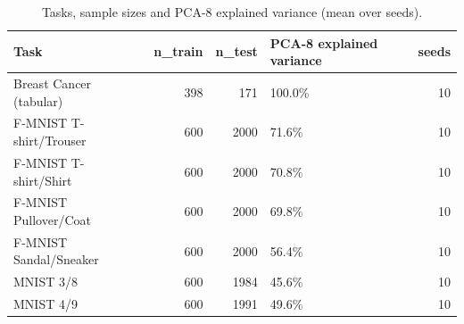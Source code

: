 \begin{table}
\caption{Tasks, sample sizes and PCA-8 explained variance (mean over seeds).}
\label{tab:table1_tasks}
\begin{tabular}{lrrlr}
\toprule
Task & n\_train & n\_test & PCA-8 explained variance & seeds \\
\midrule
Breast Cancer (tabular) & 398 & 171 & 100.0\% & 10 \\
F-MNIST T-shirt/Trouser & 600 & 2000 & 71.6\% & 10 \\
F-MNIST T-shirt/Shirt & 600 & 2000 & 70.8\% & 10 \\
F-MNIST Pullover/Coat & 600 & 2000 & 69.8\% & 10 \\
F-MNIST Sandal/Sneaker & 600 & 2000 & 56.4\% & 10 \\
MNIST 3/8 & 600 & 1984 & 45.6\% & 10 \\
MNIST 4/9 & 600 & 1991 & 49.6\% & 10 \\
\bottomrule
\end{tabular}
\end{table}
